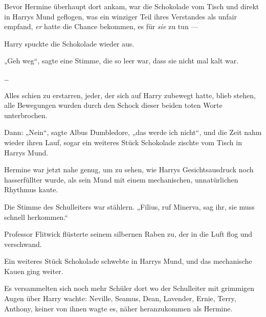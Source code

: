 Bevor Hermine überhaupt dort ankam, war die Schokolade vom Tisch und direkt in Harrys Mund geflogen, was ein winziger Teil ihres Verstandes als unfair empfand, \emph{er} hatte die Chance bekommen, es für \emph{sie} zu tun —

Harry spuckte die Schokolade wieder aus.

„Geh weg“, sagte eine Stimme, die so leer war, dass sie nicht mal kalt war.

…

Alles schien zu erstarren, jeder, der sich auf Harry zubewegt hatte, blieb stehen, alle Bewegungen wurden durch den Schock dieser beiden toten Worte unterbrochen.

Dann:
„Nein“, sagte Albus Dumbledore, „das werde ich nicht“, und die Zeit nahm wieder ihren Lauf, sogar ein weiteres Stück Schokolade zischte vom Tisch in Harrys Mund.

Hermine war jetzt nahe genug, um zu sehen, wie Harrys Gesichtsausdruck noch hasserfüllter wurde, als sein Mund mit einem mechanischen, unnatürlichen Rhythmus kaute.

Die Stimme des Schulleiters war stählern.
„Filius, ruf Minerva, sag ihr, sie muss schnell herkommen.“

Professor Flitwick flüsterte seinem silbernen Raben zu, der in die Luft flog und verschwand.

Ein weiteres Stück Schokolade schwebte in Harrys Mund, und das mechanische Kauen ging weiter.

Es versammelten sich noch mehr Schüler dort wo der Schulleiter mit grimmigen Augen über Harry wachte: Neville, Seamus, Dean, Lavender, Ernie, Terry, Anthony, keiner von ihnen wagte es, näher heranzukommen als Hermine.

